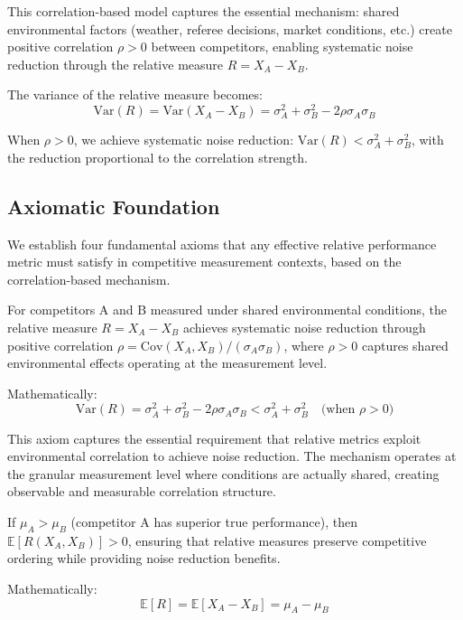 This correlation-based model captures the essential mechanism: shared environmental factors (weather, referee decisions, market conditions, etc.) create positive correlation $\rho > 0$ between competitors, enabling systematic noise reduction through the relative measure $R = X_A - X_B$.

The variance of the relative measure becomes:
\begin{equation}
\text{Var}(R) = \text{Var}(X_A - X_B) = \sigma_A^2 + \sigma_B^2 - 2\rho\sigma_A\sigma_B \label{eq:relative_variance}
\end{equation}

When $\rho > 0$, we achieve systematic noise reduction: $\text{Var}(R) < \sigma_A^2 + \sigma_B^2$, with the reduction proportional to the correlation strength.

\subsection{Axiomatic Foundation}

We establish four fundamental axioms that any effective relative performance metric must satisfy in competitive measurement contexts, based on the correlation-based mechanism.

\begin{axiom}
For competitors A and B measured under shared environmental conditions, the relative measure $R = X_A - X_B$ achieves systematic noise reduction through positive correlation $\rho = \text{Cov}(X_A, X_B)/(\sigma_A \sigma_B)$, where $\rho > 0$ captures shared environmental effects operating at the measurement level.

Mathematically:
$$\text{Var}(R) = \sigma_A^2 + \sigma_B^2 - 2\rho\sigma_A \sigma_B < \sigma_A^2 + \sigma_B^2 \quad \text{(when } \rho > 0\text{)}$$
\end{axiom}

This axiom captures the essential requirement that relative metrics exploit environmental correlation to achieve noise reduction. The mechanism operates at the granular measurement level where conditions are actually shared, creating observable and measurable correlation structure.

\begin{axiom} 
If $\mu_A > \mu_B$ (competitor A has superior true performance), then $\mathbb{E}[R(X_A, X_B)] > 0$, ensuring that relative measures preserve competitive ordering while providing noise reduction benefits.

Mathematically:
$$\mathbb{E}[R] = \mathbb{E}[X_A - X_B] = \mu_A - \mu_B$$
\end{axiom}

